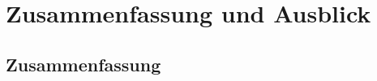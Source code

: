 \documentclass[12pt,        %
  english,ngerman,          %
  paper=a4,                 %
  captions=tablesignature,  %
  listof=numbered,          %
  bibliography=totoc,       %
  headings=small,           %
  headinclude=false,        %
  footinclude=false,        %
  parskip=half-,            %
  oneside,                  %
  BCOR=5mm,                 %
  DIV=12                    %
  ]{scrbook}                %
\begin{document}

\chapter{Zusammenfassung und Ausblick}\label{chapter:conclusions}


\section{Zusammenfassung}\label{sec:conc_summary}
\end{document}
